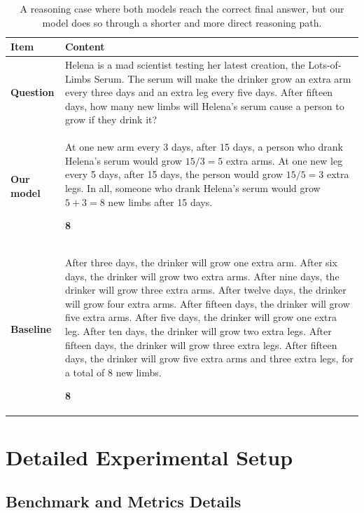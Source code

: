 \documentclass{article}
\theoremstyle{plain}
\theoremstyle{definition}
\theoremstyle{remark}
\begin{document}
\begin{table}[t]
\centering
\small
\setlength{\tabcolsep}{6pt}
\renewcommand{\arraystretch}{1.2}
\begin{tabular}{p{}p{}}
\toprule
\textbf{Item} & \textbf{Content} \\
\midrule
\textbf{Question} &
Helena is a mad scientist testing her latest creation, the Lots-of-Limbs Serum. The serum will make the drinker grow an extra arm every three days and an extra leg every five days. After fifteen days, how many new limbs will Helena's serum cause a person to grow if they drink it? \\
\midrule
\textbf{Our model} &
At one new arm every 3 days, after 15 days, a person who drank Helena's serum would grow $15/3 = 5$ extra arms. At one new leg every 5 days, after 15 days, the person would grow $15/5 = 3$ extra legs. In all, someone who drank Helena's serum would grow $5 + 3 = 8$ new limbs after 15 days.

\textbf{8} \\
\midrule
\textbf{Baseline} &
After three days, the drinker will grow one extra arm. After six days, the drinker will grow two extra arms. After nine days, the drinker will grow three extra arms. After twelve days, the drinker will grow four extra arms. After fifteen days, the drinker will grow five extra arms. After five days, the drinker will grow one extra leg. After ten days, the drinker will grow two extra legs. After fifteen days, the drinker will grow three extra legs. After fifteen days, the drinker will grow five extra arms and three extra legs, for a total of 8 new limbs.

\textbf{8} \\
\bottomrule
\end{tabular}
\caption{A reasoning case where both models reach the correct final answer, but our model does so through a shorter and more direct reasoning path.}
\label{tab:reasoning_case_limbs}
\end{table}


\section{Detailed Experimental Setup}
\label{app:experiments}

\subsection{Benchmark and Metrics Details}
\end{document}
